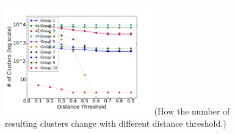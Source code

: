 \begin{figure}[t!]
\begin{center}
\includegraphics[width=2.5in]{figure/cluster}
{\footnotesize{(How the number of resulting clusters change with different distance threshold.)}}
\end{center}
\end{figure}
